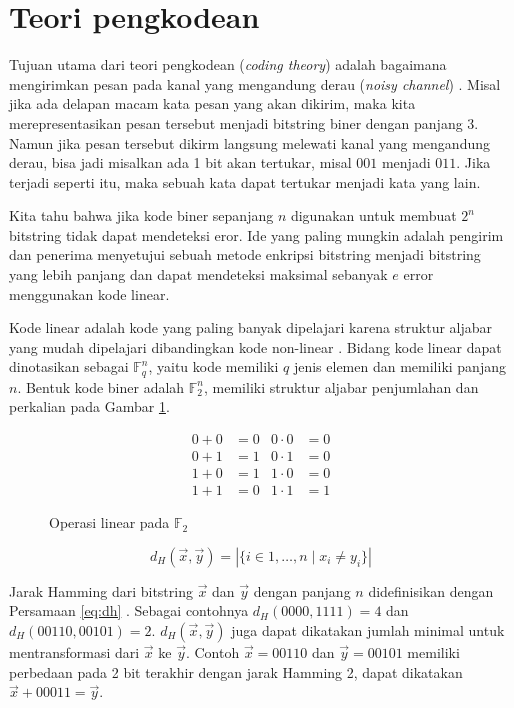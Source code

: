 \section{Teori pengkodean}

Tujuan utama dari teori pengkodean (\textit{coding theory}) adalah bagaimana mengirimkan pesan pada kanal yang mengandung derau (\textit{noisy channel}) \cite{VanLint2016}. Misal jika ada delapan macam kata pesan yang akan dikirim, maka kita merepresentasikan pesan tersebut menjadi bitstring biner dengan panjang 3. Namun jika pesan tersebut dikirm langsung melewati kanal yang mengandung derau, bisa jadi misalkan ada 1 bit akan tertukar, misal $001$ menjadi $011$. Jika terjadi seperti itu, maka sebuah kata dapat tertukar menjadi kata yang lain.

Kita tahu bahwa jika kode biner sepanjang $n$ digunakan untuk membuat $2^n$ bitstring tidak dapat mendeteksi eror. Ide yang paling mungkin adalah pengirim dan penerima menyetujui sebuah metode enkripsi bitstring menjadi bitstring yang lebih panjang dan dapat mendeteksi maksimal sebanyak $e$ error menggunakan kode linear.

Kode linear adalah kode yang paling banyak dipelajari karena struktur aljabar yang mudah dipelajari dibandingkan kode non-linear \cite{Huffman}. Bidang kode linear dapat dinotasikan sebagai $\mathbb{F}_q^n$, yaitu kode memiliki $q$ jenis elemen dan memiliki panjang $n$. Bentuk kode biner adalah $\mathbb{F}_2^n$, memiliki struktur aljabar penjumlahan dan perkalian pada Gambar \ref{fig:algebra}.

\begin{figure}
\centering
\begin{align*}
0 + 0 &= 0 & 0 \cdot 0 &= 0 \\
0 + 1 &= 1 & 0 \cdot 1 &= 0 \\
1 + 0 &= 1 & 1 \cdot 0 &= 0 \\
1 + 1 &= 0 & 1 \cdot 1 &= 1
\end{align*}
\caption{Operasi linear pada $\mathbb{F}_2$}
\label{fig:algebra}
\end{figure}

\begin{equation} \label{eq:dh}
d_H(\vec{x},\vec{y}) = |\{i \in {1,\ldots,n} \mid x_i \neq y_i\}|
\end{equation}

Jarak Hamming dari bitstring $\vec{x}$ dan $\vec{y}$ dengan panjang $n$ didefinisikan dengan Persamaan \ref{eq:dh} \cite{Cicalese2000}. Sebagai contohnya $d_H(0000,1111)= 4$ dan $d_H(00110,00101)= 2$. $d_H(\vec{x},\vec{y})$ juga dapat dikatakan jumlah minimal untuk mentransformasi dari $\vec{x}$ ke $\vec{y}$. Contoh $\vec{x}=00110$ dan $\vec{y}=00101$ memiliki perbedaan pada 2 bit terakhir dengan jarak Hamming 2, dapat dikatakan $\vec{x}+00011 = \vec{y}$.

